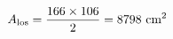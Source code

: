 \documentclass[preview]{standalone}
\begin{document}
\begin{align*}
\special{dvisvgm:raw <g id='unique000'>}A_{\text{los}} = \frac{166 \times 106}{2} = 8798 \text{ cm}^2\special{dvisvgm:raw </g>}
\end{align*}
\end{document}
